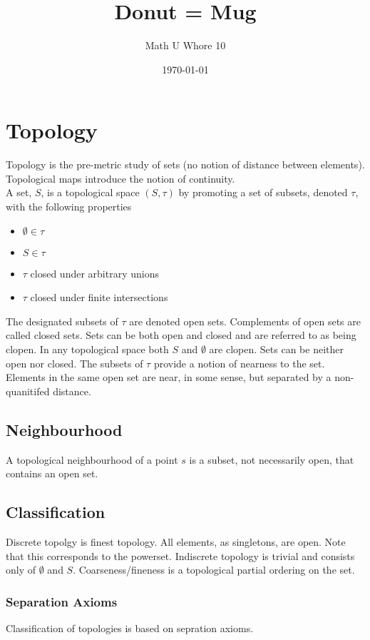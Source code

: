 \documentclass[a4paper]{scrartcl}
\title{Donut = Mug}
\author{Math U Whore 10}
\date{\today}
\begin{document}
\maketitle

\section{Topology}
Topology is the pre-metric study of sets (no notion of distance between elements). Topological maps introduce the notion of continuity.\\
A set, $S$, is a topological space $(S,\tau)$ by promoting a set of subsets, denoted $\tau$, with the following properties
\begin{itemize}
\item{$\emptyset\in\tau$}
\item{$S\in\tau$}
\item{$\tau$ closed under arbitrary unions}
\item{$\tau$ closed under finite intersections}
\end{itemize}
The designated subsets of $\tau$ are denoted open sets. Complements of open sets are called closed sets. Sets can be both open and closed and are referred to as being clopen. In any topological space both $S$ and $\emptyset$ are clopen. Sets can be neither open nor closed. The subsets of $\tau$ provide a notion of nearness to the set. Elements in the same open set are near, in some sense, but separated by a non-quanitifed distance. 

\subsection{Neighbourhood}
A topological neighbourhood of a point $s$ is a subset, not necessarily open, that contains an open set.

\subsection{Classification}
Discrete topolgy is finest topology. All elements, as singletons, are open. Note that this corresponds to the powerset. Indiscrete topology is trivial and consists only of $\emptyset$ and $S$. Coarseness/fineness is a topological partial ordering on the set.

\subsubsection{Separation Axioms}
Classification of topologies is based on sepration axioms.\\
\end{document}
